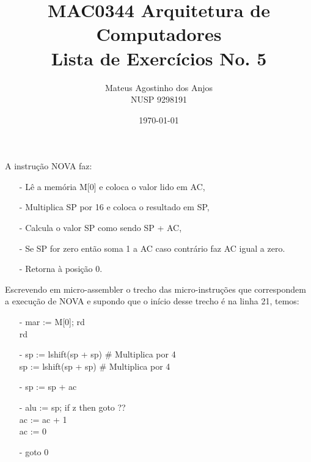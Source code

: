 \documentclass[12pt]{article}
\title{MAC0344 Arquitetura de Computadores\\
Lista de Exercícios No. 5
}
\author{Mateus Agostinho dos Anjos\\NUSP 9298191}
\date{\today}
\begin{document}
	\maketitle
    A instrução NOVA faz:
    \begin{itemize}
        \item[-]
            Lê a memória M[0] e coloca o valor lido em AC,
        \item[-]
            Multiplica SP por 16 e coloca o resultado em SP,
        \item[-]  
            Calcula o valor SP como sendo SP + AC,
        \item[-] 
            Se SP for zero então soma 1 a AC
            caso contrário faz AC igual a zero.
        \item[-]
            Retorna à posição 0.
    \end{itemize}

    Escrevendo em micro-assembler o trecho das micro-instruções que 
    correspondem a execução de NOVA e supondo que o início desse trecho é na 
    linha 21, temos:

    \begin{itemize}
        \item[-]
            mar := M[0]; rd\\
            rd\\
        \item[-]
            sp := lshift(sp + sp) \# Multiplica por 4\\
            sp := lshift(sp + sp) \# Multiplica por 4\\
        \item[-]  
            sp := sp + ac\\
        \item[-] 
            alu := sp; if z then goto ??\\
            ac := ac + 1\\
            ac := 0\\
        \item[-]
            goto 0
    \end{itemize}
\end{document}
